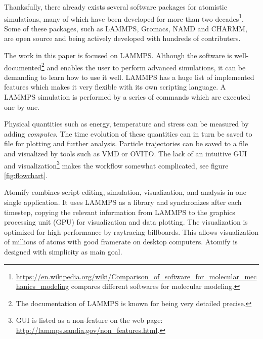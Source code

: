 \documentclass[aps,pre,twocolumn,letterpaper,floatfix,nofootinbib]{revtex4}
\begin{document}
Thanksfully, there already exists several software packages for atomistic simulations, many of which have been developed for more than two decades\footnote{\url{https://en.wikipedia.org/wiki/Comparison_of_software_for_molecular_mechanics_modeling} compares different softwares for molecular modeling.}.
Some of these packages, such as LAMMPS\citep{Plimpton1995Fast}, Gromacs\citep{berendsen1995gromacs}, NAMD\citep{Phillips2005Scalable} and CHARMM\citep{brooks2009charmm}, are open source and being actively developed with hundreds of contributers.

The work in this paper is focused on LAMMPS.
Although the software is well-documented\footnote{The documentation of LAMMPS is known for being very detailed precise.} and enables the user to perform
advanced simulations, it can be demanding to learn how to use it well.
LAMMPS has a huge list of implemented features which makes it very flexible with its own scripting language.
A LAMMPS simulation is performed by a series of commands which are executed one by one.

Physical quantities such as energy, temperature and stress can be measured by adding \textit{computes}.
The time evolution of these quantities can in turn be saved to file for plotting
and further analysis.
Particle trajectories can be saved to a file and visualized by tools such as
VMD\citep{Humphrey1996Vmd} or OVITO\citep{Stukowski2009Visualization}.
The lack of an intuitive GUI and visualization\footnote{GUI is listed as a non-feature on the web page:
\url{http://lammps.sandia.gov/non_features.html}.} makes the workflow somewhat
complicated, see figure \ref{fig:flowchart}.

Atomify combines script editing, simulation,
visualization, and analysis in one single application.
It uses LAMMPS as a library and synchronizes after each timestep,
copying the relevant information from LAMMPS to the graphics processing unit
(GPU) for visualization and data plotting.
The visualization is optimized for high performance by raytracing billboards.
This allows visualization of millions of atoms with good framerate on desktop
computers. Atomify is designed with simplicity as main goal.
\end{document}
